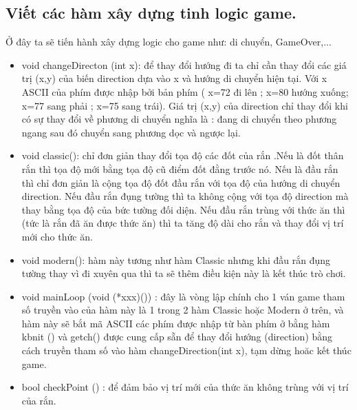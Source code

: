 \documentclass[13pt,a4paper]{article}
\begin{document}
\subsection{Viết các hàm xây dựng tinh logic game.}
\indent Ở đây ta sẽ tiến hành xây dựng logic cho game như: di chuyển, GameOver,...
\begin{itemize}
    \item void changeDirecton (int x): để thay đổi hướng đi ta chỉ cần thay đổi các giá trị (x,y) của biến direction dựa vào x và hướng di chuyển hiện tại. Với x ASCII của phím được nhập bởi bản phím ( x=72 đi lên ; x=80 hướng xuống; x=77 sang phải ; x=75 sang trái). Giá trị (x,y) của direction chỉ thay đổi khi có sự thay đổi về phương di chuyển nghĩa là : đang di chuyển theo phương ngang sau đó chuyển sang phương dọc và ngược lại.
    \item void classic(): chỉ đơn giản thay đổi tọa độ các đốt của rắn .Nếu là đốt thân rắn thì tọa độ mới bằng tọa độ cũ điểm đốt đằng trước nó. Nếu là đầu rắn thì chỉ đơn giản là cộng tọa độ đốt đầu rắn với tọa độ của hướng di chuyển direction. Nếu đầu rắn đụng tường thì ta không cộng với tọa độ direction mà thay bằng tọa độ của bức tường đối diện. Nếu đầu rắn trùng với thức ăn thì (tức là rắn đã ăn được thức ăn) thì ta tăng độ dài cho rắn và thay đổi vị trí mới cho thức ăn.
    \item void modern(): hàm này tương như hàm Classic nhưng khi đầu rắn đụng tường thay vì đi xuyên qua thì ta sẽ thêm điều kiện này là kết thúc trò chơi.
    \item void mainLoop (void (*xxx)()) : đây là vòng lập chính cho 1 ván game  tham số truyền vào của hàm này là 1 trong 2 hàm Classic hoặc Modern ở trên, và hàm này sẽ bắt  mã ASCII các phím được nhập từ bàn phím ở bằng hàm kbnit () và getch() được cung cấp sẵn để thay đổi hướng (direction) bằng cách truyền tham số vào hàm changeDirection(int x),  tạm dừng hoăc kết thúc game.
    \item bool checkPoint () : để đảm bảo vị trí mới của thức ăn không trùng với vị trí của rắn.
\end{itemize}
\end{document}
